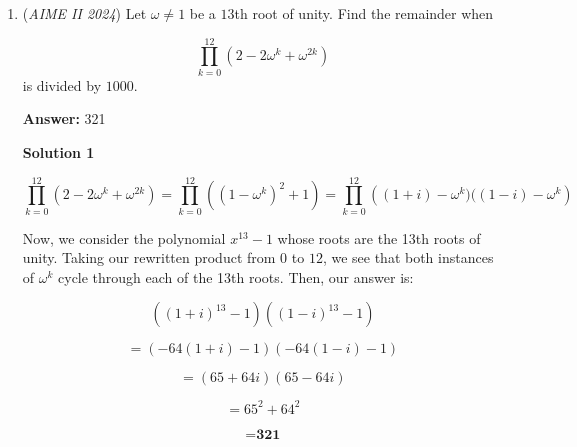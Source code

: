 \begin{enumerate}
 Also, evaluating the limit $L$ of $f(\theta)$ as $\theta\to \frac{\pi}{3}$:
 \[L=\lim_{\theta\to\frac{\pi}{3}}\frac{\sin\theta -\frac{\sqrt{3}}{2}}{\tan\theta-\sqrt{3}}\]Or
 \[L=\lim_{\theta\to\frac{\pi}{3}}\frac{\sin\theta -\sin\dfrac\pi 3}{\tan\theta-\tan\dfrac\pi 3}\]By the Cauchy Mean Value Theorem, there exists $\xi$ that lies between $\theta$ and $\frac{\pi}{3}$ such that
 \[\frac{\sin\theta -\sin\dfrac\pi 3}{\tan\theta-\tan\dfrac\pi 3}=\frac{\cos\xi}{\sec^2 \xi}\]As $\theta\to\dfrac\pi 3, \xi\to \dfrac\pi 3$. Substituting,
 \[L=\lim_{\theta\to\frac{\pi}{3}}\frac{\cos \xi}{\sec^2 \xi}=\cos^3\dfrac \pi 3=\dfrac 18\]Because $f$ is continuous and strictly decreasing on each of the interval $\left(0,\dfrac \pi 3\right)$ and $\left(\dfrac \pi 3,\dfrac \pi 2\right)$, we have $f(\theta)\in\left(0,\frac{1}{8}\right)\cup\left(\frac{1}{8},\frac{1}{2}\right)$. 

 Therefore, the unique point $C$ that does not belong to any segments in $\mathcal{F}$ is at $x_0=\frac{1}{8}$.We have $y_0=\frac{3\sqrt{3}}{8}$. Hence,
 \[OC^2=x_0^2+y_0^2=\frac{7}{16}\]The requested sum is $7+16=\boxed{023}$.

 (no calculus)

 


	\item (\textit{AIME II 2024}) Let $\omega\neq 1$ be a $13$th root of unity. Find the remainder when

 \[\prod_{k=0}^{12}(2-2\omega^k+\omega^{2k})\]
is divided by $1000$.


 
 \textbf{Answer: }321



\textbf{Solution 1}


 \[\prod_{k=0}^{12} \left(2- 2\omega^k + \omega^{2k}\right) = \prod_{k=0}^{12} \left((1 - \omega^k)^2 + 1\right) = \prod_{k=0}^{12} \left((1 + i) - \omega^k)((1 - i) - \omega^k\right)\]

 Now, we consider the polynomial $x^{13} - 1$ whose roots are the 13th roots of unity. Taking our rewritten product from $0$ to $12$, we see that both instances of $\omega^k$ cycle through each of the 13th roots. Then, our answer is:

 
 \[((1 + i)^{13} - 1)((1 - i)^{13} - 1)\]

 \[= (-64(1 + i) - 1)(-64(1 - i) - 1)\]

 \[= (65 + 64i)(65 - 64i)\]

 \[= 65^2 + 64^2\]

 \[= \boxed{\textbf{321}}\]





\end{enumerate}
